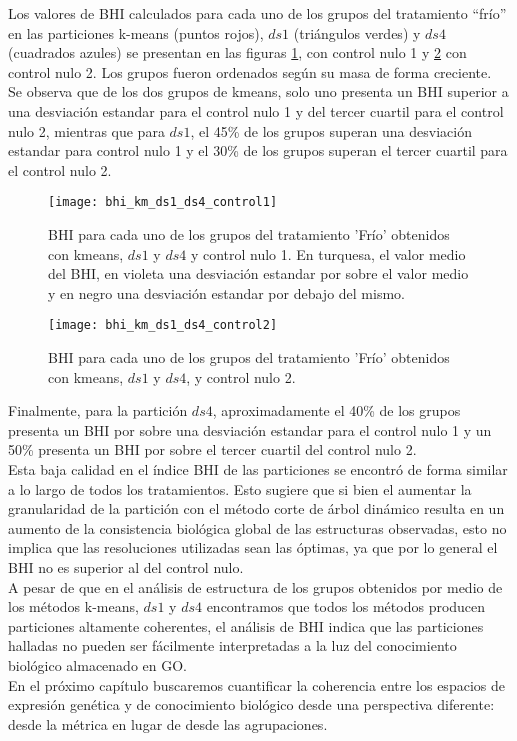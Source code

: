 Los valores de BHI calculados para cada uno de los grupos del tratamiento ``frío'' en las particiones k-means (puntos rojos), $ds1$ (triángulos verdes) y $ds4$ (cuadrados azules) se presentan en las figuras \ref{fig:bhi_km_ds1_ds4_control1}, con control nulo 1 y \ref{fig:bhi_km_ds1_ds4_control2} con control nulo 2. Los grupos fueron ordenados según su masa de forma creciente.\\
Se observa que de los dos grupos de kmeans, solo uno presenta un BHI superior a una desviación estandar para el control nulo 1 y del tercer cuartil para el control nulo 2, mientras que para $ds1$, el 45\% de los grupos superan una desviación estandar para control nulo 1 y el 30\% de los grupos superan el tercer cuartil para el control nulo 2.
\begin{figure*}[t!]
    \centering
    \begin{subfigure}[t]{0.8\textwidth}
    \centering
    \texttt{[image: bhi\_km\_ds1\_ds4\_control1]}
    \caption{BHI para cada uno de los grupos del tratamiento 'Frío' obtenidos con kmeans, $ds1$ y $ds4$ y control nulo 1. En turquesa, el valor medio del BHI, en violeta una desviación estandar por sobre el valor medio y en negro una desviación estandar por debajo del mismo.}
    \label{fig:bhi_km_ds1_ds4_control1}
    \end{subfigure}
    \begin{subfigure}[t]{0.8\textwidth}
    \centering
    \texttt{[image: bhi\_km\_ds1\_ds4\_control2]}
    \caption{BHI para cada uno de los grupos del tratamiento 'Frío' obtenidos con kmeans, $ds1$ y $ds4$, y control nulo 2.}
    \label{fig:bhi_km_ds1_ds4_control2}
    \end{subfigure}
    \caption{Índice de Homogeneidad Biológica, BHI, para cada uno de los grupos del tratamiento 'Frío' obtenidos con kmeans, $ds1$ y $ds4$ y controles nulos.}
\end{figure*}

Finalmente, para la partición $ds4$, aproximadamente el 40\% de los grupos presenta un BHI por sobre una desviación estandar para el control nulo 1 y un 50\% presenta un BHI por sobre el tercer cuartil del control nulo 2.\\ 
Esta baja calidad en el índice BHI de las particiones se encontró de forma similar a lo largo de todos los tratamientos. Esto sugiere que si bien el aumentar la granularidad de la partición con el método corte de árbol dinámico resulta en un aumento de la consistencia biológica global de las estructuras observadas, esto no implica que las resoluciones utilizadas sean las óptimas, ya que por lo general el BHI no es superior al del control nulo.\\
A pesar de que en el análisis de estructura de los grupos obtenidos por medio de los métodos k-means, $ds1$ y $ds4$ encontramos que todos los métodos producen particiones altamente coherentes, el análisis de BHI indica que las particiones halladas no pueden ser fácilmente interpretadas a la luz del conocimiento biológico almacenado en GO.\\
En el próximo capítulo buscaremos cuantificar la coherencia entre los espacios de expresión genética y de conocimiento biológico desde una perspectiva diferente: desde la métrica en lugar de desde las agrupaciones.
